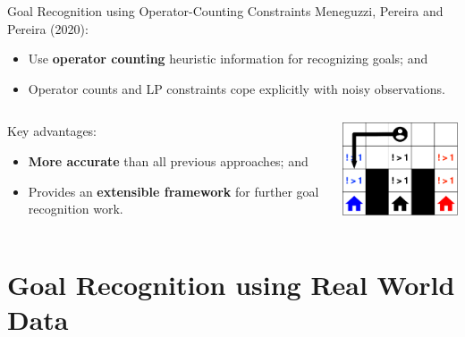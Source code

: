 \documentclass[usenames,dvipsnames]{beamer}
\begin{document}
\begin{frame}[c]{Goal Recognition using Operator-Counting Constraints}
	Meneguzzi, Pereira and Pereira (2020):
   	\begin{itemize}
		\item Use \textbf{operator counting} heuristic information for recognizing goals; and
		\item Operator counts and LP constraints cope explicitly with noisy observations.
	\end{itemize}
	\begin{columns}
		\begin{column}{.5\textwidth}
			Key advantages:
			\begin{itemize}
				\item \textbf{More accurate} than all previous approaches; and
				\item Provides an \textbf{extensible framework} for further goal recognition work.
			\end{itemize}
		\end{column}
		\begin{column}{.5\textwidth}
			\begin{center}
				\includegraphics[width=12em]{fig/gr-approaches/gr-operator-counting.pdf}
			\end{center}
		\end{column}
	\end{columns}
\end{frame}


\section{Goal Recognition using Real World Data}
\end{document}

